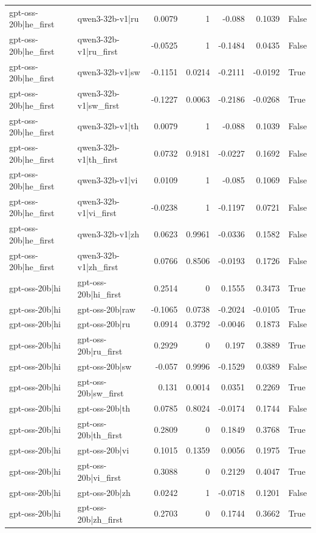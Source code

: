 \begin{table}
\begin{tabular}{l l r r r r l}
gpt-oss-20b|he_first & qwen3-32b-v1|ru & 0.0079 & 1 & -0.088 & 0.1039 & False \\
gpt-oss-20b|he_first & qwen3-32b-v1|ru_first & -0.0525 & 1 & -0.1484 & 0.0435 & False \\
gpt-oss-20b|he_first & qwen3-32b-v1|sw & -0.1151 & 0.0214 & -0.2111 & -0.0192 & True \\
gpt-oss-20b|he_first & qwen3-32b-v1|sw_first & -0.1227 & 0.0063 & -0.2186 & -0.0268 & True \\
gpt-oss-20b|he_first & qwen3-32b-v1|th & 0.0079 & 1 & -0.088 & 0.1039 & False \\
gpt-oss-20b|he_first & qwen3-32b-v1|th_first & 0.0732 & 0.9181 & -0.0227 & 0.1692 & False \\
gpt-oss-20b|he_first & qwen3-32b-v1|vi & 0.0109 & 1 & -0.085 & 0.1069 & False \\
gpt-oss-20b|he_first & qwen3-32b-v1|vi_first & -0.0238 & 1 & -0.1197 & 0.0721 & False \\
gpt-oss-20b|he_first & qwen3-32b-v1|zh & 0.0623 & 0.9961 & -0.0336 & 0.1582 & False \\
gpt-oss-20b|he_first & qwen3-32b-v1|zh_first & 0.0766 & 0.8506 & -0.0193 & 0.1726 & False \\
gpt-oss-20b|hi & gpt-oss-20b|hi_first & 0.2514 & 0 & 0.1555 & 0.3473 & True \\
gpt-oss-20b|hi & gpt-oss-20b|raw & -0.1065 & 0.0738 & -0.2024 & -0.0105 & True \\
gpt-oss-20b|hi & gpt-oss-20b|ru & 0.0914 & 0.3792 & -0.0046 & 0.1873 & False \\
gpt-oss-20b|hi & gpt-oss-20b|ru_first & 0.2929 & 0 & 0.197 & 0.3889 & True \\
gpt-oss-20b|hi & gpt-oss-20b|sw & -0.057 & 0.9996 & -0.1529 & 0.0389 & False \\
gpt-oss-20b|hi & gpt-oss-20b|sw_first & 0.131 & 0.0014 & 0.0351 & 0.2269 & True \\
gpt-oss-20b|hi & gpt-oss-20b|th & 0.0785 & 0.8024 & -0.0174 & 0.1744 & False \\
gpt-oss-20b|hi & gpt-oss-20b|th_first & 0.2809 & 0 & 0.1849 & 0.3768 & True \\
gpt-oss-20b|hi & gpt-oss-20b|vi & 0.1015 & 0.1359 & 0.0056 & 0.1975 & True \\
gpt-oss-20b|hi & gpt-oss-20b|vi_first & 0.3088 & 0 & 0.2129 & 0.4047 & True \\
gpt-oss-20b|hi & gpt-oss-20b|zh & 0.0242 & 1 & -0.0718 & 0.1201 & False \\
gpt-oss-20b|hi & gpt-oss-20b|zh_first & 0.2703 & 0 & 0.1744 & 0.3662 & True \\

\end{tabular}
\end{table}
